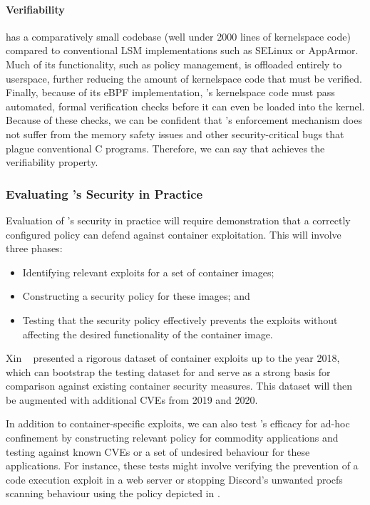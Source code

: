 \paragraph*{Verifiability}

\bpfcontain{} has a comparatively small codebase (well under 2000 lines of kernelspace code) compared to conventional LSM implementations such as SELinux or AppArmor. Much of its functionality, such as policy management, is offloaded entirely to userspace, further reducing the amount of kernelspace code that must be verified. Finally, because of its eBPF implementation, \bpfcontain{}'s kernelspace code must pass automated, formal verification checks before it can even be loaded into the kernel. Because of these checks, we can be confident that \bpfcontain{}'s enforcement mechanism does not suffer from the memory safety issues and other security-critical bugs that plague conventional C programs. Therefore, we can say that \bpfcontain{} achieves the verifiability property.

\subsubsection{Evaluating \bpfcontain{}'s Security in Practice}

Evaluation of \bpfcontain{}'s security in practice will require demonstration that a correctly configured \bpfcontain{} policy can defend against container exploitation. This will involve three phases:
\begin{itemize}
  \item Identifying relevant exploits for a set of container images;
  \item Constructing a security policy for these images; and
  \item Testing that the security policy effectively prevents the exploits without affecting the desired functionality of the container image.
\end{itemize}
Xin \etal~\cite{xin2018_container_security} presented a rigorous dataset of container exploits up to the year 2018, which can bootstrap the testing dataset for \bpfcontain{} and serve as a strong basis for comparison against existing container security measures. This dataset will then be augmented with additional CVEs from 2019 and 2020.

In addition to container-specific exploits, we can also test \bpfcontain{}'s efficacy for ad-hoc confinement by constructing relevant \bpfcontain{} policy for commodity applications and testing against known CVEs or a set of undesired behaviour for these applications. For instance, these tests might involve verifying the prevention of a code execution exploit in a web server or stopping Discord's unwanted procfs scanning behaviour using the policy depicted in .


